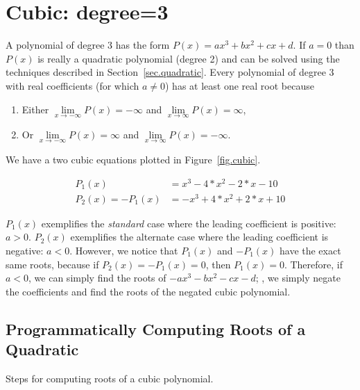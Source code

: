 \section{Cubic: degree=3}
\label{sec.cubic}

A polynomial of degree 3 has the form $P(x) = a x^3 + b x^2 + c x + d$. If $a=0$ than $P(x)$ is really
a quadratic polynomial (degree 2) and can be solved using the techniques described in Section~\ref{sec.quadratic}.  Every polynomial of degree 3
with real coefficients (for which $a\neq 0$) has at least one real root because 
\begin{enumerate}
\item Either $\lim\limits_{x\to-\infty}P(x) = -\infty$ and $\lim\limits_{x\to\infty}P(x) = \infty$,
  \item Or $\lim\limits_{x\to-\infty}P(x) = \infty$ and $\lim\limits_{x\to\infty}P(x) = -\infty$.
\end{enumerate}


We have a two cubic equations plotted in Figure~\ref{fig.cubic}.

\begin{align*}
  P_1(x) &= x^3 - 4*x^2 - 2*x - 10\\
  P_2(x) = -P_1(x) &= -x^3 + 4*x^2 + 2*x + 10
\end{align*}

$P_1(x)$ exemplifies the \emph{standard} case where the leading coefficient is positive: $a>0$.
$P_2(x)$ exemplifies the alternate case where the leading coefficient is negative: $a<0$.
However, we notice that $P_1(x)$ and $-P_1(x)$ have the exact same roots, because if $P_2(x) = -P_1(x) = 0$,
then $P_1(x) = 0$.  Therefore, if $a<0$, we can simply find the roots of $-a x^3 -b x^2 - c x - d$;
\ie, we simply negate the coefficients and find the roots of the negated cubic polynomial.


\subsection{Programmatically Computing Roots of a Quadratic}

Steps for computing roots of a cubic polynomial.

